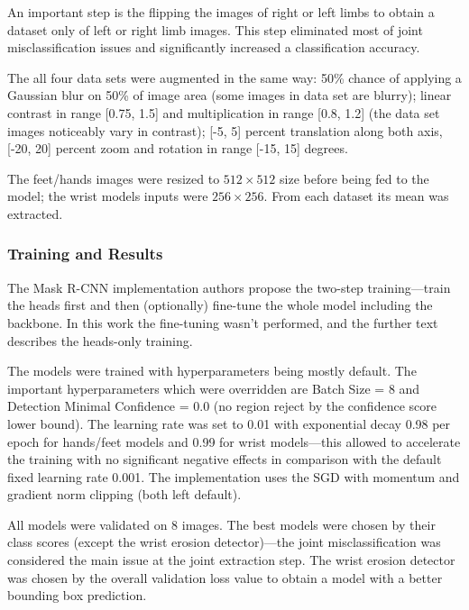 \documentclass[thesis=B,english]{FITthesis}[2019/12/23]
\begin{document}
An important step is the flipping the images of right or left limbs to obtain a dataset only of left or right limb images. This step eliminated most of joint misclassification issues and significantly increased a classification accuracy.

The all four data sets were augmented in the same way: 50\% chance of applying a Gaussian blur on 50\% of image area (some images in data set are blurry); linear contrast in range [0.75, 1.5] and multiplication in range [0.8, 1.2] (the data set images noticeably vary in contrast); [-5, 5] percent translation along both axis, [-20, 20] percent zoom and rotation in range [-15, 15] degrees.

The feet/hands images were resized to $512 \times 512$ size before being fed to the model; the wrist models inputs were $256 \times 256$. From each dataset its mean was extracted.

\subsubsection{Training and Results}

The Mask R-CNN implementation authors propose the two-step training---train the heads first and then (optionally) fine-tune the whole model including the backbone. In this work the fine-tuning wasn't performed, and the further text describes the heads-only training.

The models were trained with hyperparameters being mostly default. The important hyperparameters which were overridden are Batch Size = 8 and Detection Minimal Confidence = 0.0 (no region reject by the confidence score lower bound). The learning rate was set to 0.01 with exponential decay 0.98 per epoch for hands/feet models and 0.99 for wrist models---this allowed to accelerate the training with no significant negative effects in comparison with the default fixed learning rate 0.001. The implementation uses the SGD with momentum and gradient norm clipping (both left default).

All models were validated on 8 images. The best models were chosen by their class scores (except the wrist erosion detector)---the joint misclassification was considered the main issue at the joint extraction step. The wrist erosion detector was chosen by the overall validation loss value to obtain a model with a better bounding box prediction.
\end{document}
